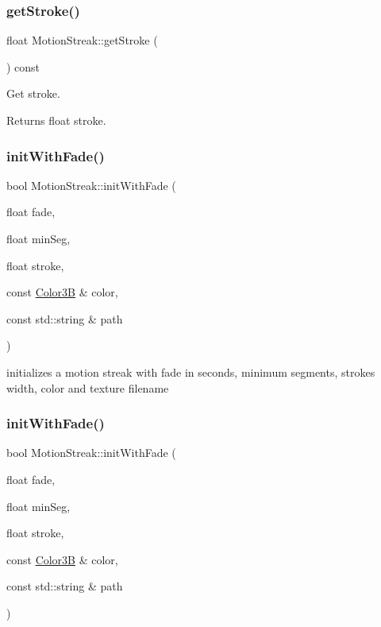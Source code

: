 \subsubsection{\texorpdfstring{get\+Stroke()}{getStroke()}\hspace{0.1cm}{\footnotesize\ttfamily [2/2]}}
{\footnotesize\ttfamily float Motion\+Streak\+::get\+Stroke (\begin{DoxyParamCaption}{ }\end{DoxyParamCaption}) const\hspace{0.3cm}{\ttfamily [inline]}}

Get stroke.

\begin{DoxyReturn}{Returns}
float stroke. 
\end{DoxyReturn}
\mbox{\label{classMotionStreak_a2691831b200b8426ed8bf6d0dfd688d9}} 
\subsubsection{\texorpdfstring{init\+With\+Fade()}{initWithFade()}\hspace{0.1cm}{\footnotesize\ttfamily [1/4]}}
{\footnotesize\ttfamily bool Motion\+Streak\+::init\+With\+Fade (\begin{DoxyParamCaption}\item[{float}]{fade,  }\item[{float}]{min\+Seg,  }\item[{float}]{stroke,  }\item[{const \hyperlink{structColor3B}{Color3B} \&}]{color,  }\item[{const std\+::string \&}]{path }\end{DoxyParamCaption})}

initializes a motion streak with fade in seconds, minimum segments, stroke\textquotesingle{}s width, color and texture filename \mbox{\label{classMotionStreak_a2691831b200b8426ed8bf6d0dfd688d9}} 
\subsubsection{\texorpdfstring{init\+With\+Fade()}{initWithFade()}\hspace{0.1cm}{\footnotesize\ttfamily [2/4]}}
{\footnotesize\ttfamily bool Motion\+Streak\+::init\+With\+Fade (\begin{DoxyParamCaption}\item[{float}]{fade,  }\item[{float}]{min\+Seg,  }\item[{float}]{stroke,  }\item[{const \hyperlink{structColor3B}{Color3B} \&}]{color,  }\item[{const std\+::string \&}]{path }\end{DoxyParamCaption})}

